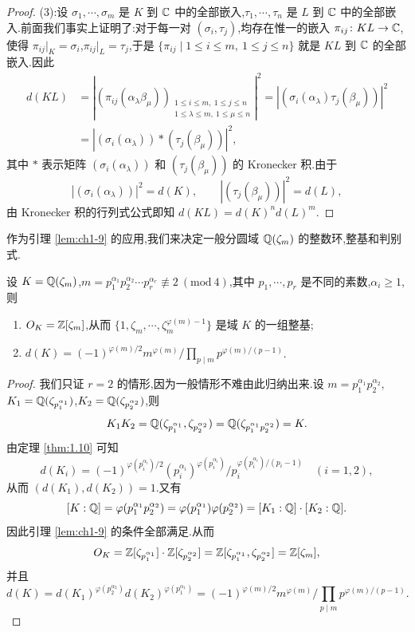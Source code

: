 \begin{proof}
(3):设 $\sigma_1,\cdots,\sigma_m$ 是 $K$ 到 $\mathbb{C}$ 中的全部嵌入,$\tau_1,\cdots,\tau_n$ 是 $L$ 到 $\mathbb{C}$ 中的全部嵌入.前面我们事实上证明了:对于每一对 $(\sigma_i,\tau_j)$,均存在惟一的嵌入 $\pi_{ij}\colon KL\to\mathbb{C}$,使得 $\pi_{ij}|_K=\sigma_i$,$\pi_{ij}|_L=\tau_j$,于是 $\{\pi_{ij}\mid 1\leqslant i\leqslant m,\ 1\leqslant j\leqslant n\}$ 就是 $KL$ 到 $\mathbb{C}$ 的全部嵌入.因此
\begin{align*}
  d(KL)&=\left|(\pi_{ij}(\alpha_\lambda\beta_\mu))_{\substack{1\leqslant i\leqslant m,\ 1\leqslant j\leqslant n\\ 1\leqslant \lambda\leqslant m,\ 1\leqslant \mu\leqslant n}}\right|^2
  =\left|(\sigma_i(\alpha_\lambda)\tau_j(\beta_\mu))\right|^2\\
  &=\left|(\sigma_i(\alpha_\lambda))*(\tau_j(\beta_\mu))\right|^2,
\end{align*}
其中 $*$ 表示矩阵 $(\sigma_i(\alpha_\lambda))$ 和 $(\tau_j(\beta_\mu))$ 的 Kronecker 积.由于
\[
  \left|(\sigma_i(\alpha_\lambda))\right|^2=d(K),\qquad
  \left|(\tau_j(\beta_\mu))\right|^2=d(L),
\]
由 Kronecker 积的行列式公式即知 $d(KL)=d(K)^nd(L)^m$.
\end{proof}

作为引理 \ref{lem:ch1-9} 的应用,我们来决定一般分圆域 $\mathbb{Q}(\zeta_m)$ 的整数环,整基和判别式.

\begin{theorem}\label{thm:1.12}
设 $K=\mathbb{Q}(\zeta_m)$,$m=p_1^{\alpha_1}p_2^{\alpha_2}\cdots p_r^{\alpha_r}\not\equiv 2\ (\mathrm{mod}\ 4)$,其中 $p_1,\cdots,p_r$ 是不同的素数,$\alpha_i\geqslant 1$,则
\begin{enumerate}[(1)]
  \item $O_K=\mathbb{Z}[\zeta_m]$,从而 $\{1,\zeta_m,\cdots,\zeta_m^{\varphi(m)-1}\}$ 是域 $K$ 的一组整基;
  \item $d(K)=(-1)^{\varphi(m)/2}m^{\varphi(m)}\Big/\displaystyle\prod_{p\mid m}p^{\varphi(m)/(p-1)}$.
\end{enumerate}
\end{theorem}

\begin{proof}
我们只证 $r=2$ 的情形,因为一般情形不难由此归纳出来.设 $m=p_1^{\alpha_1}p_2^{\alpha_2}$,$K_1=\mathbb{Q}(\zeta_{p_1^{\alpha_1}})$,$K_2=\mathbb{Q}(\zeta_{p_2^{\alpha_2}})$,则
\[
  K_1K_2=\mathbb{Q}(\zeta_{p_1^{\alpha_1}},\zeta_{p_2^{\alpha_2}})=\mathbb{Q}(\zeta_{p_1^{\alpha_1}p_2^{\alpha_2}})=K.
\]
由定理 \ref{thm:1.10} 可知
\[
  d(K_i)=(-1)^{\varphi(p_i^{\alpha_i})/2}(p_i^{\alpha_i})^{\varphi(p_i^{\alpha_i})}
  \Big/p_i^{\varphi(p_i^{\alpha_i})/(p_i-1)}\quad (i=1,2),
\]
从而 $(d(K_1),d(K_2))=1$.又有
\[
  [K:\mathbb{Q}]=\varphi(p_1^{\alpha_1}p_2^{\alpha_2})=\varphi(p_1^{\alpha_1})\varphi(p_2^{\alpha_2})
  =[K_1:\mathbb{Q}]\cdot[K_2:\mathbb{Q}].
\]
因此引理 \ref{lem:ch1-9} 的条件全部满足.从而
\[
  O_K=\mathbb{Z}[\zeta_{p_1^{\alpha_1}}]\cdot\mathbb{Z}[\zeta_{p_2^{\alpha_2}}]
  =\mathbb{Z}[\zeta_{p_1^{\alpha_1}},\zeta_{p_2^{\alpha_2}}]=\mathbb{Z}[\zeta_m],
\]
并且
\[
  d(K)=d(K_1)^{\varphi(p_2^{\alpha_2})}d(K_2)^{\varphi(p_1^{\alpha_1})}
  =(-1)^{\varphi(m)/2}m^{\varphi(m)}\Big/\prod_{p\mid m}p^{\varphi(m)/(p-1)}.
\]
\end{proof}

